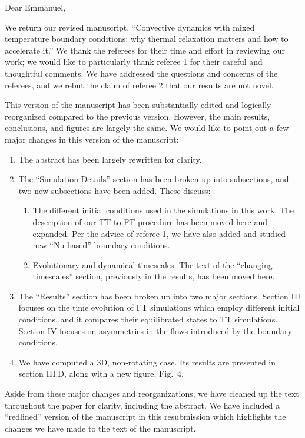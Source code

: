 \documentclass[aps, 11pt, singlecolumn]{revtex4-1} %
\begin{document}
\newenvironment{myquotation}{
\begin{quotation}
\itshape
}{ 
\end{quotation}
}
\noindent
Dear Emmanuel,
$\,$\newline

\begin{singlespace}
We return our revised manuscript, ``Convective dynamics with mixed temperature boundary conditions: why thermal relaxation matters and how to accelerate it.'' 
We thank the referees for their time and effort in reviewing our work; we would like to particularly thank referee 1 for their careful and thoughtful comments.
We have addressed the questions and concerns of the referees, and we rebut the claim of referee 2 that our results are not novel.

This version of the manuscript has been substantially edited and logically reorganized compared to the previous version.
However, the main results, conclusions, and figures are largely the same.
We would like to point out a few major changes in this version of the manuscript:
\begin{enumerate}
\item The abstract has been largely rewritten for clarity.
\item The ``Simulation Details'' section has been broken up into subsections, and two new subsections have been added. These discuss:
\begin{enumerate}
\item The different initial conditions used in the simulations in this work.
The description of our TT-to-FT procedure has been moved here and expanded.
Per the advice of referee 1, we have also added and studied new ``Nu-based'' boundary conditions.
\item Evolutionary and dynamical timescales.
The text of the ``changing timescales'' section, previously in the results, has been moved here.
\end{enumerate}
\item The ``Results'' section has been broken up into two major sections.
Section III focuses on the time evolution of FT simulations which employ different initial conditions, and it compares their equilibrated states to TT simulations.
Section IV focuses on asymmetries in the flows introduced by the boundary conditions.
\item We have computed a 3D, non-rotating case.
Its results are presented in section III.D, along with a new figure, Fig.~4.
\end{enumerate}
Aside from these major changes and reorganizations, we have cleaned up the text throughout the paper for clarity, including the abstract.
We have included a ``redlined'' version of the manuscript in this resubmission which highlights the changes we have made to the text of the manuscript.


\end{singlespace}
\end{document}
